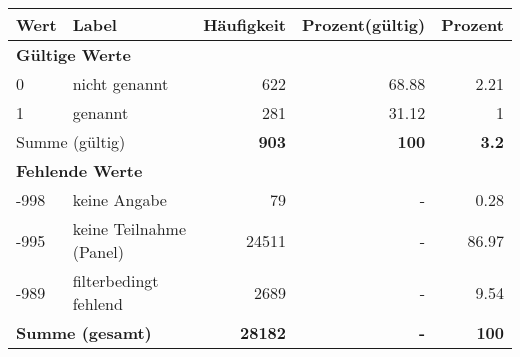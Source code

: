      \begin{longtable}{lXrrr}
     \toprule
     \textbf{Wert} & \textbf{Label} & \textbf{Häufigkeit} & \textbf{Prozent(gültig)} & \textbf{Prozent} \\
     \endhead
     \midrule
     \multicolumn{5}{l}{\textbf{Gültige Werte}}\\

     0 &
     \multicolumn{1}{X}{ nicht genannt   } &


       \num{622} &
       \num[round-mode=places,round-precision=2]{68.88} &
         \num[round-mode=places,round-precision=2]{2.21} \\

     1 &
     \multicolumn{1}{X}{ genannt   } &


       \num{281} &
       \num[round-mode=places,round-precision=2]{31.12} &
         \num[round-mode=places,round-precision=2]{1} \\
     \midrule
     \multicolumn{2}{l}{Summe (gültig)} &
       \textbf{\num{903}} &
     \textbf{\num{100}} &
       \textbf{\num[round-mode=places,round-precision=2]{3.2}} \\
     \multicolumn{5}{l}{\textbf{Fehlende Werte}}\\
       -998 &
       keine Angabe &
         \num{79} &
        - &
         \num[round-mode=places,round-precision=2]{0.28} \\
       -995 &
       keine Teilnahme (Panel) &
         \num{24511} &
        - &
         \num[round-mode=places,round-precision=2]{86.97} \\
       -989 &
       filterbedingt fehlend &
         \num{2689} &
        - &
         \num[round-mode=places,round-precision=2]{9.54} \\
     \midrule
     \multicolumn{2}{l}{\textbf{Summe (gesamt)}} &
          \textbf{\num{28182}} &
        \textbf{-} &
        \textbf{\num{100}} \\
     \bottomrule
     \end{longtable}
     
